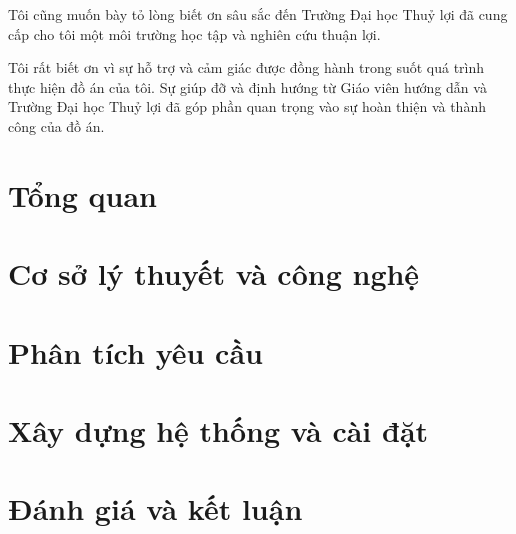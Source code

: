 \documentclass[a4paper,12pt,oneside]{report}
\theoremstyle{definition}
\begin{document}
Tôi cũng muốn bày tỏ lòng biết ơn sâu sắc đến Trường Đại học Thuỷ lợi đã cung cấp cho tôi một môi trường học tập và nghiên cứu thuận lợi.

Tôi rất biết ơn vì sự hỗ trợ và cảm giác được đồng hành trong suốt quá trình thực hiện đồ án của tôi. Sự giúp đỡ và định hướng từ Giáo viên hướng dẫn và Trường Đại học Thuỷ lợi đã góp phần quan trọng vào sự hoàn thiện và thành công của đồ án.

\pagestyle{empty} %
\newpage
\tableofcontents %

\listoffigures %

\glsaddall
\newpage
{}

\newpage
\pagestyle{fancy} %
\chapter{Tổng quan}


\newpage
\pagestyle{fancy} %
\chapter{Cơ sở lý thuyết và công nghệ}


\newpage
\pagestyle{fancy} %
\chapter{Phân tích yêu cầu}


\newpage
\pagestyle{fancy} %
\chapter{Xây dựng hệ thống và cài đặt}


\newpage
\pagestyle{fancy} %
\chapter{Đánh giá và kết luận}


\newpage
\printbibliography %
\end{document}
